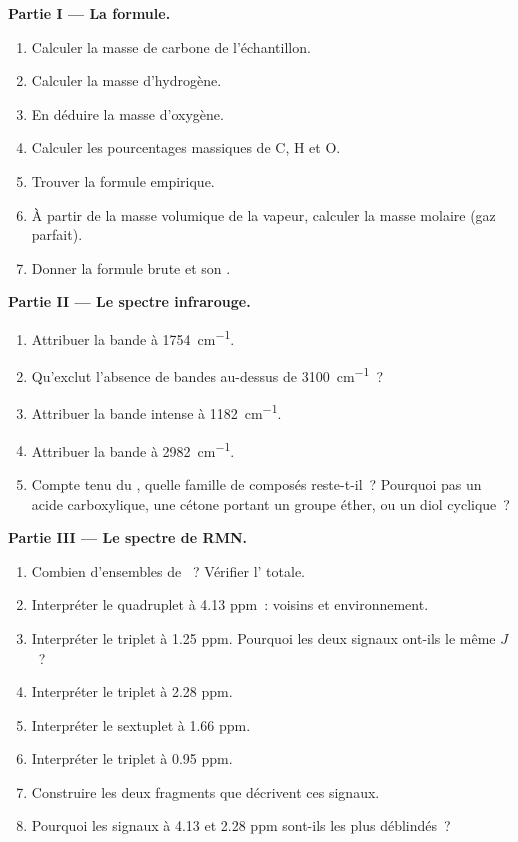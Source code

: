 \begin{problem}
\medskip
\noindent\textbf{Partie I --- La formule.}
\begin{enumerate}
  \item Calculer la masse de carbone de l'échantillon.
  \item Calculer la masse d'hydrogène.
  \item En déduire la masse d'oxygène.
  \item Calculer les pourcentages massiques de C, H et O.
  \item Trouver la formule empirique.
  \item À partir de la masse volumique de la vapeur, calculer la masse
        molaire (gaz parfait).
  \item Donner la formule brute et son .
\end{enumerate}

\medskip
\noindent\textbf{Partie II --- Le spectre infrarouge.}
\begin{enumerate}[resume]
  \item Attribuer la bande à \qty{1754}{cm^{-1}}.
  \item Qu'exclut l'absence de bandes au-dessus de \qty{3100}{cm^{-1}}~?
  \item Attribuer la bande intense à \qty{1182}{cm^{-1}}.
  \item Attribuer la bande à \qty{2982}{cm^{-1}}.
  \item Compte tenu du , quelle famille de
        composés reste-t-il~? Pourquoi pas un acide carboxylique, une
        cétone portant un groupe éther, ou un diol cyclique~?
\end{enumerate}

\medskip
\noindent\textbf{Partie III --- Le spectre de RMN.}
\begin{enumerate}[resume]
  \item Combien d'ensembles de ~? Vérifier
        l' totale.
  \item Interpréter le quadruplet à 4.13 ppm~: voisins et environnement.
  \item Interpréter le triplet à 1.25 ppm. Pourquoi les deux signaux
        ont-ils le même $J$~?
  \item Interpréter le triplet à 2.28 ppm.
  \item Interpréter le sextuplet à 1.66 ppm.
  \item Interpréter le triplet à 0.95 ppm.
  \item Construire les deux fragments que décrivent ces signaux.
  \item Pourquoi les signaux à 4.13 et 2.28 ppm sont-ils les plus
        déblindés~?
\end{enumerate}


\end{problem}
